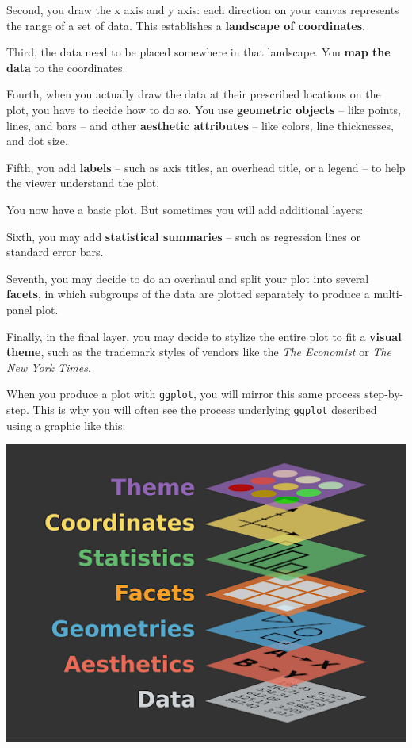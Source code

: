 \documentclass[]{book}
\begin{document}
Second, you draw the x axis and y axis: each direction on your canvas represents the range of a set of data. This establishes a \textbf{landscape of coordinates}.

Third, the data need to be placed somewhere in that landscape. You \textbf{map the data} to the coordinates.

Fourth, when you actually draw the data at their prescribed locations on the plot, you have to decide how to do so. You use \textbf{geometric objects} -- like points, lines, and bars -- and other \textbf{aesthetic attributes} -- like colors, line thicknesses, and dot size.

Fifth, you add \textbf{labels} -- such as axis titles, an overhead title, or a legend -- to help the viewer understand the plot.

You now have a basic plot. But sometimes you will add additional layers:

Sixth, you may add \textbf{statistical summaries} -- such as regression lines or standard error bars.

Seventh, you may decide to do an overhaul and split your plot into several \textbf{facets}, in which subgroups of the data are plotted separately to produce a multi-panel plot.

Finally, in the final layer, you may decide to stylize the entire plot to fit a \textbf{visual theme}, such as the trademark styles of vendors like the \emph{The Economist} or \emph{The New York Times}.

When you produce a plot with \texttt{ggplot}, you will mirror this same process step-by-step. This is why you will often see the process underlying \texttt{ggplot} described using a graphic like this:

\includegraphics{img/ggplot.png}
\end{document}
